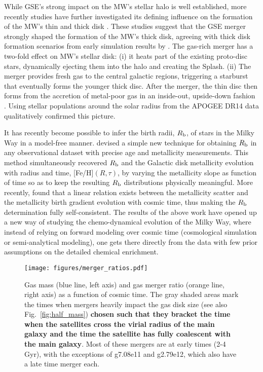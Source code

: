\documentclass[useAMS,usenatbib]{mnras}
\begin{document}
While GSE's strong impact on the MW's stellar halo is well established, more recently studies have further investigated its defining influence on the formation of the MW's thin and thick disk \citep[e.g.][]{Grand2020,Ciuca2022,Orkney2022,Rey2023}. These studies suggest that the GSE merger strongly shaped the formation of the MW's thick disk, agreeing with thick disk formation scenarios from early simulation results by \cite{Brook2004, Brook2006}. The gas-rich merger has a two-fold effect on MW's stellar disk: (i) it heats part of the existing proto-disc stars, dynamically ejecting them into the halo and creating the Splash. (ii) The merger provides fresh gas to the central galactic regions, triggering a starburst \citep[potentially after first causing a pause in star formation;][]{Vincenzo2019} that eventually forms the younger thick disc. After the merger, the thin disc then forms from the accretion of metal-poor gas in an inside-out, upside-down fashion \citep[e.g.,][]{Bird2013, Minchev2013, Grand2018, Buck2020a}. Using stellar populations around the solar radius from the APOGEE DR14 data \citet{Ciuca2021} qualitatively confirmed this picture. 

It has recently become possible to infer the birth radii, $R_{\rm{b}}$, of stars in the Milky Way in a model-free manner. \cite{Minchev2018} devised a simple new technique for obtaining $R_{\rm{b}}$ in any observational dataset with precise age and metallicity measurements. This method simultaneously recovered $R_{\rm{b}}$ and the Galactic disk metallicity evolution with radius and time, [Fe/H]$(R,\tau)$, by varying the metallicity slope as function of time so as to keep the resulting $R_{\rm{b}}$ distributions physically meaningful. More recently, \cite{Lu2022b} found that a linear relation exists between the metallicity scatter and the metallicity birth gradient evolution with cosmic time, thus making the $R_{\rm{b}}$ determination fully self-consistent. The results of the above work have opened up a new way of studying the chemo-dynamical evolution of the Milky Way, where instead of relying on forward modeling over cosmic time (cosmological simulation or semi-analytical modeling), one gets there directly from the data with few prior assumptions on the detailed chemical enrichment.

\begin{figure*}
    \begin{centering}
        \texttt{[image: figures/merger\_ratios.pdf]}
        \vspace*{-1.75em}
        \caption{Gas mass (blue line, left axis) and gas merger ratio (orange line, right axis) as a function of cosmic time. The gray shaded areas mark the times when mergers heavily impact the gas disk size (see also Fig.~\ref{fig:half_mass}) \textbf{chosen such that they bracket the time when the satellites cross the virial radius of the main galaxy and the time the satellite has fully coalescent with the main galaxy}. Most of these mergers are at early times (2-4 Gyr), with the exceptions of g7.08e11 and g2.79e12, which also have a late time merger each.}
        \label{fig:merger_ratio}
    \end{centering}
\end{figure*}
\end{document}
